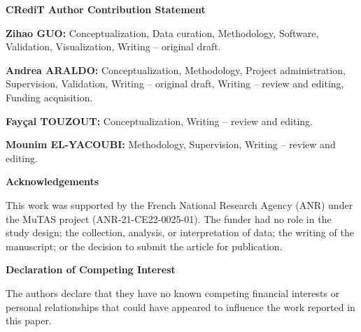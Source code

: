 \documentclass[a4paper,12pt]{article}
\begin{document}
\vspace{1.5em}

\noindent\textbf{CRediT Author Contribution Statement}

\vspace{0.3em}

\noindent
\textbf{Zihao GUO:} Conceptualization, Data curation, Methodology, Software,
Validation, Visualization, Writing -- original draft.

\noindent
\textbf{Andrea ARALDO:} Conceptualization, Methodology,
Project administration, Supervision, Validation, Writing -- original draft,
Writing -- review and editing, Funding acquisition.

\noindent
\textbf{Fay\c{c}al TOUZOUT:} Conceptualization, Writing -- review and editing.

\noindent
\textbf{Mounim EL-YACOUBI:} Methodology, Supervision, Writing -- review and editing.

\noindent

\vspace{1.5em}

\noindent\textbf{Acknowledgements}

\vspace{0.3em}

\noindent
This work was supported by the French National Research Agency (ANR) under the MuTAS project (ANR-21-CE22-0025-01). The funder had no role in the study design; the collection, analysis, or interpretation of data; the writing of the manuscript; or the decision to submit the article for publication.

\vspace{1.5em}

\noindent\textbf{Declaration of Competing Interest}

\vspace{0.3em}

\noindent
The authors declare that they have no known competing financial interests or personal relationships that could have appeared to influence the work reported in this paper.
\end{document}
